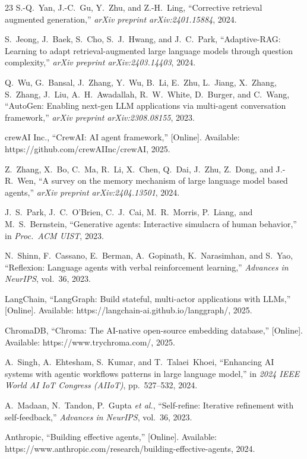\documentclass[conference]{IEEEtran}
\begin{document}
\begin{thebibliography}{23}
S.-Q.~Yan, J.-C.~Gu, Y.~Zhu, and Z.-H.~Ling, ``Corrective retrieval augmented generation,'' \textit{arXiv preprint arXiv:2401.15884}, 2024.

S.~Jeong, J.~Baek, S.~Cho, S.~J.~Hwang, and J.~C.~Park, ``Adaptive-RAG: Learning to adapt retrieval-augmented large language models through question complexity,'' \textit{arXiv preprint arXiv:2403.14403}, 2024.

Q.~Wu, G.~Bansal, J.~Zhang, Y.~Wu, B.~Li, E.~Zhu, L.~Jiang, X.~Zhang, S.~Zhang, J.~Liu, A.~H.~Awadallah, R.~W.~White, D.~Burger, and C.~Wang, ``AutoGen: Enabling next-gen LLM applications via multi-agent conversation framework,'' \textit{arXiv preprint arXiv:2308.08155}, 2023.

crewAI Inc., ``CrewAI: AI agent framework,'' [Online]. Available: https://github.com/crewAIInc/crewAI, 2025.

Z.~Zhang, X.~Bo, C.~Ma, R.~Li, X.~Chen, Q.~Dai, J.~Zhu, Z.~Dong, and J.-R.~Wen, ``A survey on the memory mechanism of large language model based agents,'' \textit{arXiv preprint arXiv:2404.13501}, 2024.

J.~S.~Park, J.~C.~O'Brien, C.~J.~Cai, M.~R.~Morris, P.~Liang, and M.~S.~Bernstein, ``Generative agents: Interactive simulacra of human behavior,'' in \textit{Proc.\ ACM UIST}, 2023.

N.~Shinn, F.~Cassano, E.~Berman, A.~Gopinath, K.~Narasimhan, and S.~Yao, ``Reflexion: Language agents with verbal reinforcement learning,'' \textit{Advances in NeurIPS}, vol.~36, 2023.

LangChain, ``LangGraph: Build stateful, multi-actor applications with LLMs,'' [Online]. Available: https://langchain-ai.github.io/langgraph/, 2025.

ChromaDB, ``Chroma: The AI-native open-source embedding database,'' [Online]. Available: https://www.trychroma.com/, 2025.

A.~Singh, A.~Ehtesham, S.~Kumar, and T.~Talaei~Khoei, ``Enhancing AI systems with agentic workflows patterns in large language model,'' in \textit{2024 IEEE World AI IoT Congress (AIIoT)}, pp.~527--532, 2024.

A.~Madaan, N.~Tandon, P.~Gupta \textit{et al.}, ``Self-refine: Iterative refinement with self-feedback,'' \textit{Advances in NeurIPS}, vol.~36, 2023.

Anthropic, ``Building effective agents,'' [Online]. Available: https://www.anthropic.com/research/building-effective-agents, 2024.

\end{thebibliography}
\end{document}
